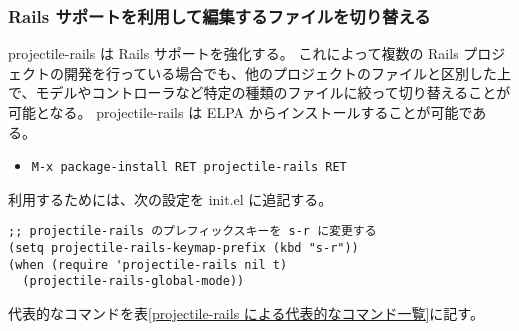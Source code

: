 \subsubsection{Rails サポートを利用して編集するファイルを切り替える}
projectile-rails は Rails サポートを強化する。
これによって複数の Rails プロジェクトの開発を行っている場合でも、他のプロジェクトのファイルと区別した上で、モデルやコントローラなど特定の種類のファイルに絞って切り替えることが可能となる。
projectile-rails は ELPA からインストールすることが可能である。
\begin{itemize}\setlength{\leftskip}{-1.00zw}%
\item[] \texttt{M-x package-install RET projectile-rails RET}
\end{itemize}
利用するためには、次の設定を init.el に追記する。
\begin{mdframed}[roundcorner=0.50zw,leftmargin=3.00zw,rightmargin=3.00zw,skipabove=0.40zw,skipbelow=0.40zw,innertopmargin=4.00pt,innerbottommargin=4.00pt,innerleftmargin=5.00pt,innerrightmargin=5.00pt,linecolor=gray!020,linewidth=0.50pt,backgroundcolor=gray!20]
\begin{verbatim}
;; projectile-rails のプレフィックスキーを s-r に変更する
(setq projectile-rails-keymap-prefix (kbd "s-r"))
(when (require 'projectile-rails nil t)
  (projectile-rails-global-mode))
\end{verbatim}
\end{mdframed}
代表的なコマンドを表\ref{projectile-rails による代表的なコマンド一覧}に記す。
